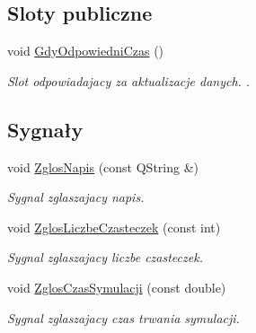 \subsection*{Sloty publiczne}
\begin{DoxyCompactItemize}
\item 
void \hyperlink{class_zbiornik_aa07ceb0fcbf307f0aa1eb75c32f3f47e}{Gdy\-Odpowiedni\-Czas} ()
\begin{DoxyCompactList}\small\item\em Slot odpowiadajacy za aktualizacje danych. . \end{DoxyCompactList}\end{DoxyCompactItemize}
\subsection*{Sygnały}
\begin{DoxyCompactItemize}
\item 
void \hyperlink{class_zbiornik_a2d92e4a46f9a5dda37ddd9948046580b}{Zglos\-Napis} (const Q\-String \&)
\begin{DoxyCompactList}\small\item\em Sygnal zglaszajacy napis. \end{DoxyCompactList}\item 
void \hyperlink{class_zbiornik_ad200a7e5bc038ad94131d1a354266889}{Zglos\-Liczbe\-Czasteczek} (const int)
\begin{DoxyCompactList}\small\item\em Sygnal zglaszajacy liczbe czasteczek. \end{DoxyCompactList}\item 
void \hyperlink{class_zbiornik_a96b9ee7d80fc0f29787dc060027d2805}{Zglos\-Czas\-Symulacji} (const double)
\begin{DoxyCompactList}\small\item\em Sygnal zglaszajacy czas trwania symulacji. \end{DoxyCompactList}\end{DoxyCompactItemize}
